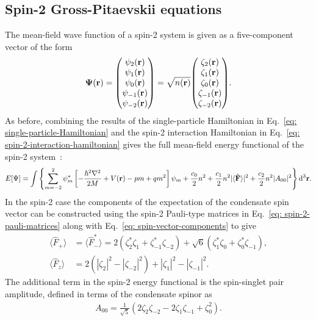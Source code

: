 \subsection{Spin-2 Gross-Pitaevskii equations}
The mean-field wave function of a spin-2 system is given as a five-component
vector of the form
\begin{align}
    \vb{\Psi}(\vb{r}) = \mqty(\psi_2(\vb{r}) \\ \psi_1(\vb{r}) \\
    \psi_0(\vb{r}) \\ \psi_{-1}(\vb{r}) \\ \psi_{-2}(\vb{r})) =
    \sqrt{n(\vb{r})}\mqty(\zeta_2(\vb{r}) \\ \zeta_1(\vb{r}) \\
    \zeta_0(\vb{r}) \\ \zeta_{-1}(\vb{r}) \\ \zeta_{-2}(\vb{r})).
\end{align}
As before, combining the results of the single-particle Hamiltonian in
Eq.~\eqref{eq: single-particle-Hamiltonian} and the spin-2 interaction
Hamiltonian in Eq.~\eqref{eq: spin-2-interaction-hamiltonian} gives the
full mean-field energy functional of the spin-2 system~\cite{Kawaguchi2012}:
\begin{equation}\label{eq: spin-2-energy-functional}
    E[\Psi] = \int \left\{\sum_{m=-2}^{2}\psi_m^*
    \left[-\frac{\hbar^2\nabla^2}{2M} + V(\vb{r}) -pm + qm^2\right]\psi_m
    + \frac{c_0}{2}n^2 + \frac{c_1}{2}n^2|\langle \hat{\vb{F}} \rangle |^2
    + \frac{c_2}{2}n^2|A_{00}|^2\right\} \dd^3\vb{r}.
\end{equation}
In the spin-2 case the components of the expectation of the condensate spin
vector can be constructed using the spin-2 Pauli-type matrices in
Eq.~\eqref{eq: spin-2-pauli-matrices} along with
Eq.~\eqref{eq: spin-vector-components} to give
\begin{align}\label{eq: spin-2-spin-vectors}
    \langle\hat{F}_+\rangle &= \langle\hat{F}_-^*\rangle =
    2\left(\zeta^*_2\zeta_1 + \zeta_{-1}^*\zeta_{-2}\right)
    + \sqrt{6}\left(\zeta_1^*\zeta_0 + \zeta_0^*\zeta_{-1}\right), \\
    \langle\hat{F}_z\rangle &= 2\left(|\zeta_2|^2-|\zeta_{-2}|^2\right)
    + |\zeta_1|^2 - |\zeta_{-1}|^2. \label{eq: spin-2-fz}
\end{align}
The additional term in the spin-2 energy functional is the spin-singlet pair
amplitude, defined in terms of the condensate spinor as
\begin{align}\label{eq: spin-singlet-duo}
    A_{00} = \frac{1}{\sqrt{5}}\left(2\zeta_2\zeta_{-2} - 2\zeta_1\zeta_{-1}
        + \zeta_0^2\right).
\end{align}

